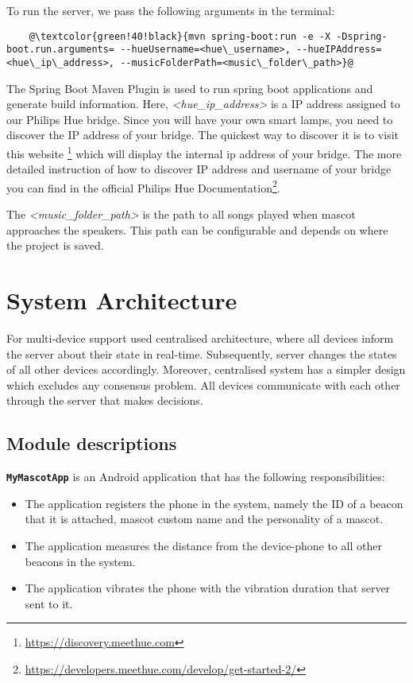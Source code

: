To run the server, we pass the following arguments in the terminal:
\begin{lstlisting}
    @\textcolor{green!40!black}{mvn spring-boot:run -e -X -Dspring-boot.run.arguments= --hueUsername=<hue\_username>, --hueIPAddress=<hue\_ip\_address>, --musicFolderPath=<music\_folder\_path>}@
\end{lstlisting}

The Spring Boot Maven Plugin is used to run spring boot applications and generate build information.
Here, \emph{<hue\_ip\_address>} is a IP address assigned to our Philips Hue bridge.
Since you will have your own smart lamps, you need to discover the IP address of your bridge.
The quickest way to discover it is to visit this website \footnote{\url{https://discovery.meethue.com}} which
will display the internal ip address of your bridge.
The more detailed instruction of how to discover IP address and username of your bridge you can
find in the official Philips Hue Documentation\footnote{\url{https://developers.meethue.com/develop/get-started-2/}}.

The \emph{<music\_folder\_path>} is the path to all songs played when mascot approaches the speakers.
This path can be configurable and depends on where the project is saved.

\section{System Architecture}
\label{sec:system-architecture}
For multi-device support used centralised architecture, where all devices inform the server about their state in real-time.
Subsequently, server changes the states of all other devices accordingly.
Moreover, centralised system has a simpler design which excludes any consensus problem.
All devices communicate with each other through the server that makes decisions.

\subsection{Module descriptions}
\label{subsec:module-descriptions}
\textbf{\texttt{MyMascotApp}} is an Android application that has the following responsibilities:
\begin{itemize}
    \item The application registers the phone in the system, namely the ID of a beacon that it is attached,
    mascot custom name and the personality of a mascot.
    \item The application measures the distance from the device-phone to all other beacons in the system.
    \item The application vibrates the phone with the vibration duration that server sent to it.
\end{itemize}

